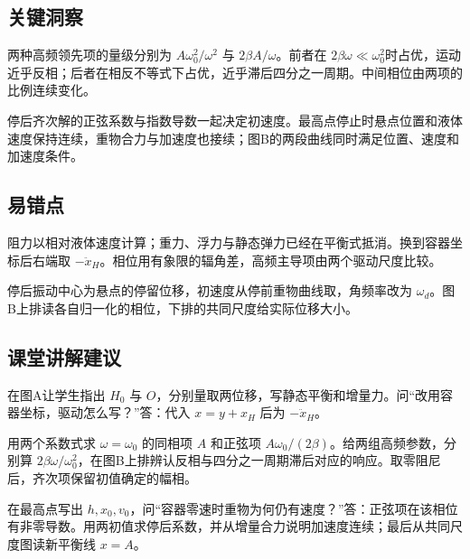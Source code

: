 \documentclass[UTF8,fontset=fandol,a4paper,11pt]{ctexart}
\begin{document}


\subsection*{关键洞察}

两种高频领先项的量级分别为 $A\omega_0^2/\omega^2$ 与 $2\beta A/\omega$。前者在 $2\beta\omega\ll\omega_0^2$时占优，运动近乎反相；后者在相反不等式下占优，近乎滞后四分之一周期。中间相位由两项的比例连续变化。

停后齐次解的正弦系数与指数导数一起决定初速度。最高点停止时悬点位置和液体速度保持连续，重物合力与加速度也接续；图B的两段曲线同时满足位置、速度和加速度条件。




\subsection*{易错点}

阻力以相对液体速度计算；重力、浮力与静态弹力已经在平衡式抵消。换到容器坐标后右端取 $-\ddot x_H$。相位用有象限的辐角差，高频主导项由两个驱动尺度比较。

停后振动中心为悬点的停留位移，初速度从停前重物曲线取，角频率改为 $\omega_d$。图B上排读各自归一化的相位，下排的共同尺度给实际位移大小。




\subsection*{课堂讲解建议}

在图A让学生指出 $H_0$ 与 $O$，分别量取两位移，写静态平衡和增量力。问“改用容器坐标，驱动怎么写？”答：代入 $x=y+x_H$ 后为 $-\ddot x_H$。

用两个系数式求 $\omega=\omega_0$ 的同相项 $A$ 和正弦项 $A\omega_0/(2\beta)$。给两组高频参数，分别算 $2\beta\omega/\omega_0^2$，在图B上排辨认反相与四分之一周期滞后对应的响应。取零阻尼后，齐次项保留初值确定的幅相。

在最高点写出 $h,x_0,v_0$，问“容器零速时重物为何仍有速度？”答：正弦项在该相位有非零导数。用两初值求停后系数，并从增量合力说明加速度连续；最后从共同尺度图读新平衡线 $x=A$。


\end{document}
